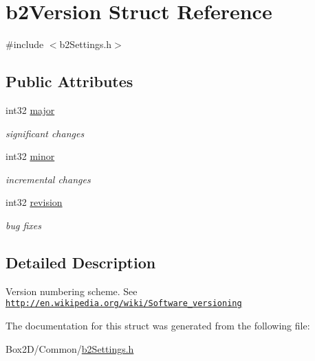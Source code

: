\hypertarget{structb2_version}{}\section{b2\+Version Struct Reference}
\label{structb2_version}


{\ttfamily \#include $<$b2\+Settings.\+h$>$}

\subsection*{Public Attributes}
\begin{DoxyCompactItemize}
\item 
\mbox{\label{structb2_version_a720da8e346364d1cb34d176125380b44}} 
int32 \hyperlink{structb2_version_a720da8e346364d1cb34d176125380b44}{major}
\begin{DoxyCompactList}\small\item\em significant changes \end{DoxyCompactList}\item 
\mbox{\label{structb2_version_a115b8797a6e0b8e53f54502bd20d89da}} 
int32 \hyperlink{structb2_version_a115b8797a6e0b8e53f54502bd20d89da}{minor}
\begin{DoxyCompactList}\small\item\em incremental changes \end{DoxyCompactList}\item 
\mbox{\label{structb2_version_a395cfe1434e348115d2ead3d72b88847}} 
int32 \hyperlink{structb2_version_a395cfe1434e348115d2ead3d72b88847}{revision}
\begin{DoxyCompactList}\small\item\em bug fixes \end{DoxyCompactList}\end{DoxyCompactItemize}


\subsection{Detailed Description}
Version numbering scheme. See \href{http://en.wikipedia.org/wiki/Software_versioning}{\tt http\+://en.\+wikipedia.\+org/wiki/\+Software\+\_\+versioning} 

The documentation for this struct was generated from the following file\+:\begin{DoxyCompactItemize}
\item 
Box2\+D/\+Common/\hyperlink{b2_settings_8h}{b2\+Settings.\+h}\end{DoxyCompactItemize}
